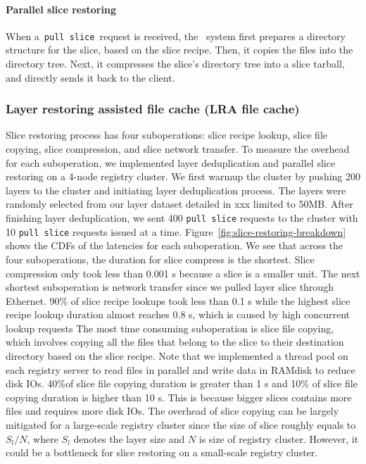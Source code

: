 \paragraph{Parallel slice restoring}
\label{subsubsec:slice-restoring}

When a~\texttt{pull slice}~request is received, the \dedupname~system 
first prepares a directory structure for the slice, based on the slice recipe.
Then, it copies the files into the directory tree.
Next, it compresses the slice's directory tree into a slice tarball,
and directly sends it back to the client.

\subsubsection{Layer restoring assisted file cache (LRA file cache)}

Slice restoring process has four suboperations: 
slice recipe lookup,
slice file copying,
slice compression, and
slice network transfer. 
To measure the overhead for each suboperation, 
we implemented layer deduplication and parallel slice
restoring on a 4-node registry cluster. 
We first warmup the cluster by pushing 200 layers to the cluster
and initiating layer deduplication process.
The layers were randomly selected from our layer dataset detailed in xxx limited to 50MB.
After finishing layer deduplication,
we sent 400 \texttt{pull slice} requests to the cluster with 10 \texttt{pull slice} requests issued at a time.
Figure~\ref{fig:slice-restoring-breakdown} shows the CDFs of the latencies for each suboperation.
We see that across the four suboperations,
the duration for slice compress is the shortest.
Slice compression only took less than 0.001 s because a slice is a smaller unit. 
The next shortest suboperation is network transfer since we pulled layer slice through Ethernet.
90\% of slice recipe lookups took less than 0.1 s while 
the highest slice recipe lookup duration almost reaches 0.8 s,
which is caused by high concurrent lookup requests 
The most time consuming suboperation is slice file copying, which involves 
copying all 
the files that belong to the slice to their destination directory based on the slice recipe.
Note that we implemented a thread pool on each registry server to read files in parallel
and write data in RAMdisk to reduce disk IOs.
40\%of slice file copying duration is greater than 1 s and 
10\% of slice file copying duration is higher than 10 s.
This is because bigger slices contains more files and requires more disk IOs.
The overhead of slice copying can be largely mitigated for a large-scale registry cluster
since the size of slice roughly equals to $S_{l}/N$, where $S_{l}$ denotes the layer size and $N$ is size of registry cluster.
However, it could be a bottleneck for slice restoring on a small-scale registry cluster.

